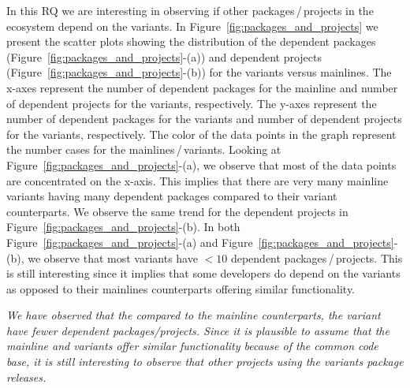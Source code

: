 In this RQ we are interesting in observing if other packages\,/\,projects in the ecosystem depend on the variants.
In Figure~\ref{fig:packages_and_projects} we present the scatter plots showing the distribution of the dependent packages (Figure~\ref{fig:packages_and_projects}-(a)) and dependent projects (Figure~\ref{fig:packages_and_projects}-(b)) for the variants versus mainlines.
The x-axes represent the number of dependent packages for the mainline and number of dependent projects for the variants, respectively.
The y-axes represent the number of dependent packages for the variants and number of dependent projects for the variants, respectively.
The color of the data points in the graph represent the number cases for the mainlines\,/\,variants.
Looking at Figure~\ref{fig:packages_and_projects}-(a), we observe that most of the data points are concentrated on the x-axis. 
This implies that there are very many mainline variants having many dependent packages compared to their variant counterparts.
We observe the same trend for the dependent projects in Figure~\ref{fig:packages_and_projects}-(b).
In both Figure~\ref{fig:packages_and_projects}-(a) and Figure~\ref{fig:packages_and_projects}-(b), we observe that most variants have $<10$ dependent packages\,/\,projects. 
This is still interesting since it implies that some developers do depend on the variants as opposed to their mainlines counterparts offering similar functionality. 

\begin{framed}
\noindent
\emph{We have observed that the compared to the mainline counterparts, the variant have fewer dependent packages/projects. Since it is plausible to assume that the mainline and variants offer similar functionality because of the common code base, it is still interesting to observe that other projects using the variants package releases.}
\end{framed}
